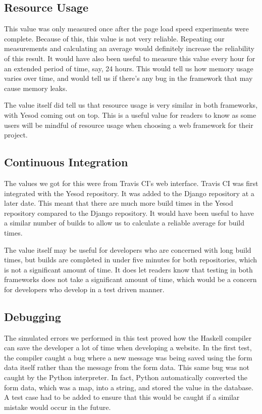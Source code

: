 \subsection{Resource Usage}

This value was only measured once after the page load speed experiments
were complete. Because of this, this value is not very reliable. Repeating
our measurements and calculating an average would definitely increase the
reliability of this result. It would have also been useful to measure this
value every hour for an extended period of time, say, 24 hours. This would
tell us how memory usage varies over time, and would tell us if there's
any bug in the framework that may cause memory leaks.

The value itself did tell us that resource usage is very similar in
both frameworks, with Yesod coming out on top. This is a useful value
for readers to know as some users will be mindful of resource usage when
choosing a web framework for their project.

\subsection{Continuous Integration}

The values we got for this were from Travis CI's web interface. Travis CI
was first integrated with the Yesod repository. It was added to the
Django repository at a later date. This meant that there are much more
build times in the Yesod repository compared to the Django repository.
It would have been useful to have a similar number of builds to allow us
to calculate a reliable average for build times.

The value itself may be useful for developers who are concerned with long
build times, but builds are completed in under five minutes for both
repositories, which is not a significant amount of time. It does let
readers know that testing in both frameworks does not take a significant
amount of time, which would be a concern for developers who develop
in a test driven manner.

\subsection{Debugging}

The simulated errors we performed in this test proved how the Haskell
compiler can save the developer a lot of time when developing a website.
In the first test, the compiler caught a bug where a new message was
being saved using the form data itself rather than the message from the
form data. This same bug was not caught by the Python interpreter. 
In fact, Python automatically converted the form data, which was a map, 
into a string, and stored the value in the database. A test case had
to be added to ensure that this would be caught if a similar mistake
would occur in the future.

